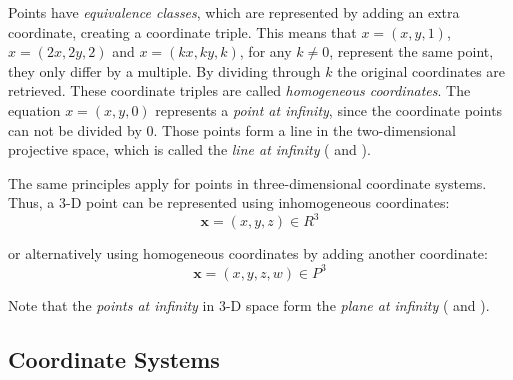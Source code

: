 Points have \textit{equivalence classes}, which are represented by adding an extra coordinate, creating a coordinate triple. This means that $x = (x,y,1)$, $x = (2x,2y,2)$ and $x=(kx,ky,k)$, for any $k\neq0$, represent the same point, they only differ by a multiple. By dividing through $k$ the original coordinates are retrieved. These coordinate triples are called \textit{homogeneous coordinates}. The equation $x = (x,y,0)$ represents a \textit{point at infinity}, since the coordinate points can not be divided by $0$. Those points form a line in the two-dimensional projective space, which is called the \textit{line at infinity} (\cite[p.30]{Szeliski.2011} and \cite[p.2]{Hartley.2011}).

The same principles apply for points in three-dimensional coordinate systems. Thus, a 3-D point  can be represented using inhomogeneous coordinates:
\begin{equation}
\mathbf{x} = (x,y,z)\in R^3
\end{equation}  

or alternatively using homogeneous coordinates by adding another coordinate:
\begin{equation}
\mathbf{x} = (x,y,z,w)\in P^3
\end{equation}  

Note that the \textit{points at infinity} in 3-D space form the \textit{plane at infinity} (\cite[p.31]{Szeliski.2011} and \cite[p.2]{Hartley.2011}).

\subsection{Coordinate Systems}
